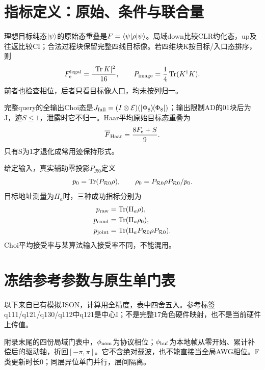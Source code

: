 \section{指标定义：原始、条件与联合量}\label{app:metrics}
理想目标纯态$\lvert \psi\rangle$的原始态重叠是$F=\langle \psi\rvert\rho\lvert \psi\rangle$。局域down比较CLR约化态，up及往返比较CI；合法过程块保留完整四线目标像。若四维块K按目标/入口态排序，则
\begin{equation}
 F_{\mathrm e}^{\rm legal}=\frac{|\operatorname{Tr} K|^2}{16},\qquad
 P_{\rm image}=\frac14\operatorname{Tr}(K^\dagger K).
\end{equation}
前者也检查相位，后者只看目标像人口，均未按列归一。

完整query的全输出Choi态是$J_{\rm full}=(I\otimes\mathcal E)(\lvert \Phi_8\rangle\!\langle \Phi_8\rvert)$；输出限制AD的01块后为J，迹$S\leq1$，泄露时它不归一。Haar平均原始目标态重叠为
\begin{equation}
 \overline F_{\rm Haar}=\frac{8F_{\mathrm e}+S}{9}.
\end{equation}
只有S为1才退化成常用迹保持形式。

给定输入，真实辅助零投影$P_{\mathcal R0}$定义
\begin{equation}
 p_0=\operatorname{Tr}(P_{\mathcal R0}\rho),\qquad
 \rho_0=P_{\mathcal R0}\rho P_{\mathcal R0}/p_0.
\end{equation}
目标地址测量为$\Pi_a$时，三种成功指标分别为
\begin{align}
 p_{\rm raw}&=\operatorname{Tr}(\Pi_a\rho),\\
 p_{\rm cond}&=\operatorname{Tr}(\Pi_a\rho_0),\\
 p_{\rm joint}&=\operatorname{Tr}(\Pi_aP_{\mathcal R0}\rho P_{\mathcal R0}).
\end{align}
Choi平均接受率与某算法输入接受率不同，不能混用。

\clearpage\section{冻结参考参数与原生单门表}\label{app:parameters}
以下来自已有模拟JSON，计算用全精度，表中四舍五入。参考标签q111/q121/q130/q112中q121是中心I；不是完整17角色硬件映射，也不是当前硬件上传值。

附录末尾的四份局域门表中，$\phi_{\rm nom}$为协议相位；$\phi_{\rm buf}$为本地帧从零开始、累计补偿后的驱动轴，折回$[-\pi,\pi]$。它不含绝对载波，也不能直接当全局AWG相位。F类更新时长0；同层异位单门并行，层间隔离。
